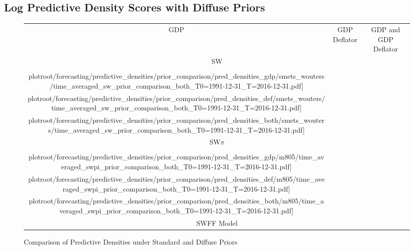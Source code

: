 \documentclass[12pt]{article}
\theoremstyle{definition}
\newcommand\plotroot{../figures_for_paper}
\begin{document}
\subsection{Log Predictive Density Scores with Diffuse Priors}
\label{subsec:forecasting_diffuseprior}
\begin{figure}[H]
    \caption{Comparison of  Predictive Densities  under Standard and Diffuse Priors}
    \label{fig:avgpreddens_standard_vs_diffuse_whole_sample}
    \begin{tabular}{@{\hspace*{-.4cm}}ccc}
        GDP & GDP Deflator & GDP and GDP Deflator \\[-.5ex]
        \multicolumn{3}{c}{SW}\\[-.5ex]
        \texttt{[image: \\plotroot/forecasting/predictive\_densities/prior\_comparison/pred\_densities\_gdp/smets\_wouters/time\_averaged\_sw\_prior\_comparison\_both\_T0=1991-12-31\_T=2016-12-31.pdf]} &
        \texttt{[image: \\plotroot/forecasting/predictive\_densities/prior\_comparison/pred\_densities\_def/smets\_wouters/time\_averaged\_sw\_prior\_comparison\_both\_T0=1991-12-31\_T=2016-12-31.pdf]} &
        \texttt{[image: \\plotroot/forecasting/predictive\_densities/prior\_comparison/pred\_densities\_both/smets\_wouters/time\_averaged\_sw\_prior\_comparison\_both\_T0=1991-12-31\_T=2016-12-31.pdf]} \\[-.5ex]
        \multicolumn{3}{c}{SW$\pi$}\\[-.5ex]
        \texttt{[image: \\plotroot/forecasting/predictive\_densities/prior\_comparison/pred\_densities\_gdp/m805/time\_averaged\_swpi\_prior\_comparison\_both\_T0=1991-12-31\_T=2016-12-31.pdf]} &
        \texttt{[image: \\plotroot/forecasting/predictive\_densities/prior\_comparison/pred\_densities\_def/m805/time\_averaged\_swpi\_prior\_comparison\_both\_T0=1991-12-31\_T=2016-12-31.pdf]} &
        \texttt{[image: \\plotroot/forecasting/predictive\_densities/prior\_comparison/pred\_densities\_both/m805/time\_averaged\_swpi\_prior\_comparison\_both\_T0=1991-12-31\_T=2016-12-31.pdf]} \\[-.5ex]
        \multicolumn{3}{c}{SWFF Model}\\[-.5ex]

\end{tabular}
\end{figure}
\end{document}
